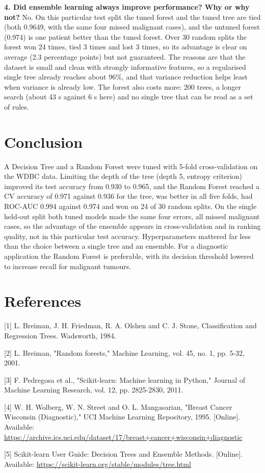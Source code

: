 \documentclass[11pt]{article}
\begin{document}
\textbf{4. Did ensemble learning always improve performance? Why or why not?} No. On this particular test split the tuned forest and the tuned tree are tied (both 0.9649, with the same four missed malignant cases), and the untuned forest (0.974) is one patient better than the tuned forest. Over 30 random splits the forest won 24 times, tied 3 times and lost 3 times, so its advantage is clear on average (2.3 percentage points) but not guaranteed. The reasons are that the dataset is small and clean with strongly informative features, so a regularised single tree already reaches about 96\%, and that variance reduction helps least when variance is already low. The forest also costs more: 200 trees, a longer search (about 43 s against 6 s here) and no single tree that can be read as a set of rules.

\section*{Conclusion}
\label{sec:org128a4e9}


A Decision Tree and a Random Forest were tuned with 5-fold cross-validation on the WDBC
data. Limiting the depth of the tree (depth 5, entropy criterion) improved its test accuracy
from 0.930 to 0.965, and the Random Forest reached a CV accuracy of 0.971 against 0.936 for
the tree, was better in all five folds, had ROC-AUC 0.994 against 0.974 and won on 24 of 30
random splits. On the single held-out split both tuned models made the same four errors, all
missed malignant cases, so the advantage of the ensemble appears in cross-validation and in
ranking quality, not in this particular test accuracy. Hyperparameters mattered far less
than the choice between a single tree and an ensemble. For a diagnostic application the
Random Forest is preferable, with its decision threshold lowered to increase recall for
malignant tumours.

\section*{References}
\label{sec:org131c2a5}


[1] L. Breiman, J. H. Friedman, R. A. Olshen and C. J. Stone, Classification and Regression Trees. Wadsworth, 1984.

[2] L. Breiman, "Random forests," Machine Learning, vol. 45, no. 1, pp. 5-32, 2001.

[3] F. Pedregosa et al., "Scikit-learn: Machine learning in Python," Journal of Machine Learning Research, vol. 12, pp. 2825-2830, 2011.

[4] W. H. Wolberg, W. N. Street and O. L. Mangasarian, "Breast Cancer Wisconsin (Diagnostic)," UCI Machine Learning Repository, 1995. [Online]. Available: \url{https://archive.ics.uci.edu/dataset/17/breast+cancer+wisconsin+diagnostic}

[5] Scikit-learn User Guide: Decision Trees and Ensemble Methods. [Online]. Available: \url{https://scikit-learn.org/stable/modules/tree.html}
\end{document}
